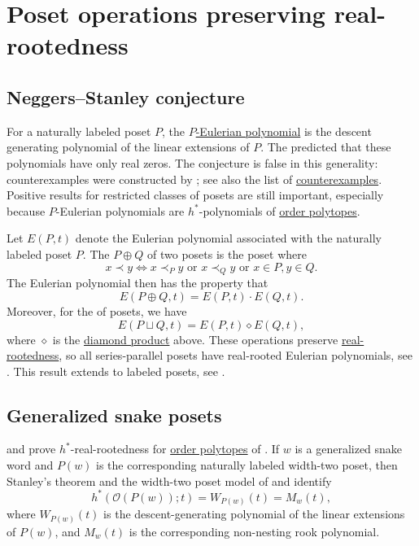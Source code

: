 \section[posetRealRooted]{Poset operations preserving real-rootedness}

\subsection[neggersStanleyConjecture]{Neggers--Stanley conjecture}

For a naturally labeled poset $P$, the
\hyperref[pEulerianPolynomial]{$P$-Eulerian polynomial} is the descent
generating polynomial of the linear extensions of $P$.  The
\label{neggersStanleyConjectureDefinition}
predicted that these polynomials have only
real zeros.  The conjecture is false in this generality: counterexamples were
constructed by 
\cite{Stembridge2007NeggersStanleyCounter}; see also the list of
\hyperref[realRootedCounterexamples]{counterexamples}.  Positive results for restricted
classes of posets are still important, especially because $P$-Eulerian
polynomials are $h^*$-polynomials of \hyperref[orderPolytope]{order
polytopes}.

\begin{example*}
Let $E(P,t)$ denote the Eulerian polynomial associated with the naturally
labeled poset $P$.
The \label{ordinalSumPoset} $P \oplus Q$ of two posets is
the poset
where
\[
x \prec y \iff x \prec_P y \text{ or } x \prec_Q y \text{ or } x \in P, y \in Q.
\]
The Eulerian polynomial then has the property that
\[
E(P \oplus Q, t) = E(P,t) \cdot E(Q,t).
\]
Moreover, for the \label{disjointUnionPoset} of posets,
we have
\[
E(P \sqcup Q, t) = E(P,t) \diamond E(Q,t),
\]
where $\diamond$ is the \hyperref[diamondProduct]{diamond product} above.
These operations preserve \hyperref[realRootedPolynomial]{real-rootedness}, so
all series-parallel posets have
real-rooted Eulerian polynomials,
see \cite{Wagner1992,Wagner1992en}.
This result extends to labeled posets, see \cite{Branden2004operators}.
\end{example*}

\subsection[generalizedSnakeRealRooted]{Generalized snake posets}

 and  prove
\(h^*\)-real-rootedness for \hyperref[orderPolytope]{order polytopes} of
\label{generalizedSnakePoset}
\cite{BraunJal2026x}.  If \(w\) is a
generalized snake word and \(P(w)\) is the corresponding naturally labeled
width-two poset, then Stanley's theorem and the width-two poset model of
 and  identify
\[
  h^*(\mathcal{O}(P(w));t)
  =
  W_{P(w)}(t)
  =
  M_w(t),
\]
where \(W_{P(w)}(t)\) is the descent-generating polynomial of the linear
extensions of \(P(w)\), and \(M_w(t)\) is the corresponding non-nesting rook
polynomial.

